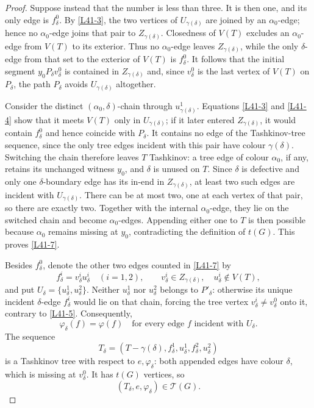 \documentclass[11pt]{article}
\theoremstyle{definition}
\newcommand{\Tcal}{\mathcal T}
\newcommand{\set}[1]{\{#1\}}
\begin{document}
\begin{proof}
Suppose instead that the number is less than three. It is then one, and its
only edge is $f^0_\delta$. By \eqref{L41-3}, the two vertices of
$U_{\gamma(\delta)}$ are joined by an $\alpha_0$-edge; hence no
$\alpha_0$-edge joins that pair to $Z_{\gamma(\delta)}$. Closedness of
$V(T)$ excludes an $\alpha_0$-edge from $V(T)$ to its exterior. Thus no
$\alpha_0$-edge leaves $Z_{\gamma(\delta)}$, while the only
$\delta$-edge from that set to the exterior of $V(T)$ is
$f^0_\delta$. It follows that the initial segment
$y_0P_\delta v^0_\delta$ is contained in $Z_{\gamma(\delta)}$ and, since
$v^0_\delta$ is the last vertex of $V(T)$ on $P_\delta$, the path
$P_\delta$ avoids $U_{\gamma(\delta)}$ altogether.

Consider the distinct $(\alpha_0,\delta)$-chain through
$u^1_{\gamma(\delta)}$. Equations \eqref{L41-3} and \eqref{L41-4} show
that it meets $V(T)$ only in $U_{\gamma(\delta)}$; if it later entered
$Z_{\gamma(\delta)}$, it would contain $f^0_\delta$ and hence coincide
with $P_\delta$. It contains no edge of the Tashkinov-tree sequence, since
the only tree edges incident with this pair have colour
$\gamma(\delta)$. Switching the chain therefore leaves $T$ Tashkinov: a
tree edge of colour $\alpha_0$, if any, retains its unchanged witness
$y_0$, and $\delta$ is unused on $T$. Since $\delta$ is defective and only
one $\delta$-boundary edge has its in-end in
$Z_{\gamma(\delta)}$, at least two such edges are incident with
$U_{\gamma(\delta)}$. There can be at most two, one at each vertex of
that pair, so there are exactly two. Together with the internal
$\alpha_0$-edge, they lie on the switched chain and become
$\alpha_0$-edges. Appending either one to $T$ is then possible because
$\alpha_0$ remains missing at $y_0$, contradicting the definition of
$t(G)$. This proves \eqref{L41-7}.

Besides $f^0_\delta$, denote the other two edges counted in
\eqref{L41-7} by
\[
 f^i_\delta=v^i_\delta u^i_\delta\quad(i=1,2),
 \qquad
 v^i_\delta\in Z_{\gamma(\delta)},
 \quad u^i_\delta\notin V(T),
\]
and put $U_\delta=\set{u^1_\delta,u^2_\delta}$. Neither
$u^1_\delta$ nor $u^2_\delta$ belongs to $P'_\delta$: otherwise its
unique incident $\delta$-edge $f^i_\delta$ would lie on that chain, forcing
the tree vertex $v^i_\delta\ne v^0_\delta$ onto it, contrary to
\eqref{L41-5}. Consequently,
\begin{equation}
 \varphi_\delta(f)=\varphi(f)
 \quad\text{for every edge $f$ incident with $U_\delta$.}
 \tag{8}\label{L41-8}
\end{equation}
The sequence
\[
 T_\delta=(T-\gamma(\delta),
            f^1_\delta,u^1_\delta,
            f^2_\delta,u^2_\delta)
\]
is a Tashkinov tree with respect to $e,\varphi_\delta$: both appended
edges have colour $\delta$, which is missing at $v^0_\delta$. It has
$t(G)$ vertices, so
\begin{equation}
 (T_\delta,e,\varphi_\delta)\in\Tcal(G).
 \tag{9}\label{L41-9}
\end{equation}


\end{proof}
\end{document}
